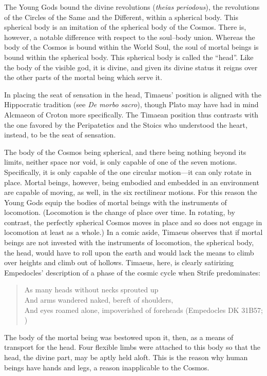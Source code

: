 The Young Gods bound the divine revolutions (\emph{theias periodous}), the revolutions of the Circles of the Same and the Different, within a spherical body. This spherical body is an imitation of the spherical body of the Cosmos. There is, however, a notable difference with respect to the soul--body union. Whereas the body of the Cosmos is bound within the World Soul, the soul of mortal beings is bound within the spherical body. This spherical body is called the ``head''. Like the body of the visible god, it is divine, and given its divine status it reigns over the other parts of the mortal being which serve it. 

In placing the seat of sensation in the head, Timaeus' position is aligned with the Hippocratic tradition (see \emph{De morbo sacro}), though Plato may have had in mind Alcmaeon of Croton more specifically. The Timaean position thus contrasts with the one favored by the Peripatetics and the Stoics who understood the heart, instead, to be the seat of sensation.

The body of the Cosmos being spherical, and there being nothing beyond its limits, neither space nor void, is only capable of one of the seven motions. Specifically, it is only capable of the one circular motion---it can only rotate in place. Mortal beings, however, being embodied and embedded in an environment are capable of moving, as well, in the six rectilinear motions. For this reason the Young Gods equip the bodies of mortal beings with the instruments of locomotion. (Locomotion is the change of place over time. In rotating, by contrast, the perfectly spherical Cosmos moves in place and so does not engage in locomotion at least as a whole.) In a comic aside, Timaeus observes that if mortal beings are not invested with the instruments of locomotion, the spherical body, the head, would have to roll upon the earth and would lack the means to climb over heights and climb out of hollows. Timaeus, here, is clearly satirizing Empedocles' description of a phase of the cosmic cycle when Strife predominates:
\begin{verse}
	As many heads without necks sprouted up\\
	And arms wandered naked, bereft of shoulders,\\
	And eyes roamed alone, impoverished of foreheads (Empedocles DK 31B57; \citealt[245]{Inwood:2001ve})
\end{verse}

The body of the mortal being was bestowed upon it, then, as a means of transport for the head. Four flexible limbs were attached to this body so that the head, the divine part, may be aptly held aloft. This is the reason why human beings have hands and legs, a reason inapplicable to the Cosmos. 

